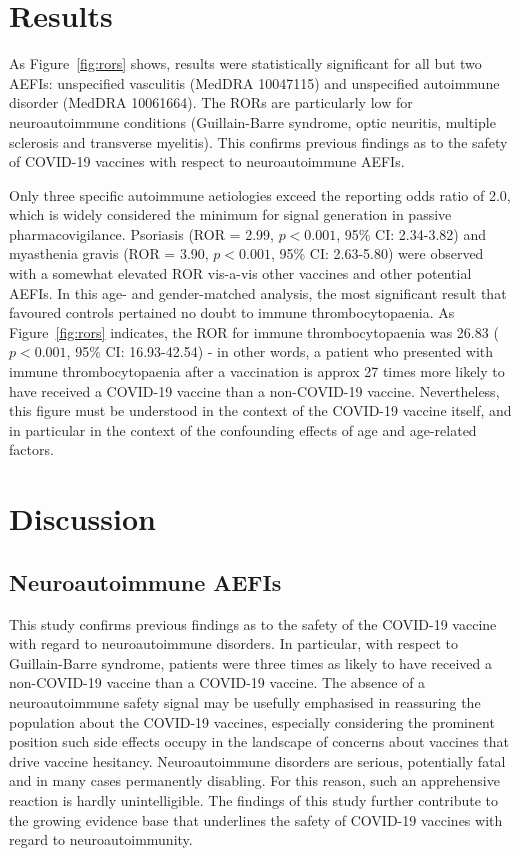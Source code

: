 \documentclass{article}
\begin{document}
\section{Results}

As Figure~\ref{fig:rors} shows, results were statistically significant for all but two AEFIs: unspecified vasculitis (MedDRA 10047115) and unspecified autoimmune disorder (MedDRA 10061664).
The RORs are particularly low for neuroautoimmune conditions (Guillain-Barre syndrome, optic neuritis, multiple sclerosis and transverse myelitis).
This confirms previous findings as to the safety of COVID-19 vaccines with respect to neuroautoimmune AEFIs.\cite{von2021vaers}

Only three specific autoimmune aetiologies exceed the reporting odds ratio of 2.0, which is widely considered the minimum for signal generation in passive pharmacovigilance.
Psoriasis (ROR = 2.99, $p < 0.001$, 95\% CI: 2.34-3.82) and myasthenia gravis (ROR = 3.90, $p < 0.001$, 95\% CI: 2.63-5.80) were observed with a somewhat elevated ROR vis-a-vis other vaccines and other potential AEFIs.
In this age- and gender-matched analysis, the most significant result that favoured controls pertained no doubt to immune thrombocytopaenia.
As Figure~\ref{fig:rors} indicates, the ROR for immune thrombocytopaenia was 26.83 ($p < 0.001$, 95\% CI: 16.93-42.54) - in other words, a patient who presented with immune thrombocytopaenia after a vaccination is approx 27 times more likely to have received a COVID-19 vaccine than a non-COVID-19 vaccine.
Nevertheless, this figure must be understood in the context of the COVID-19 vaccine itself, and in particular in the context of the confounding effects of age and age-related factors.

\section{Discussion}

\subsection{Neuroautoimmune AEFIs}

This study confirms previous findings as to the safety of the COVID-19 vaccine with regard to neuroautoimmune disorders.\cite{von2021vaers}
In particular, with respect to Guillain-Barre syndrome, patients were three times as likely to have received a non-COVID-19 vaccine than a COVID-19 vaccine.
The absence of a neuroautoimmune safety signal may be usefully emphasised in reassuring the population about the COVID-19 vaccines, especially considering the prominent position such side effects occupy in the landscape of concerns about vaccines that drive vaccine hesitancy.\cite{berry2021lessons}
Neuroautoimmune disorders are serious, potentially fatal and in many cases permanently disabling.
For this reason, such an apprehensive reaction is hardly unintelligible.
The findings of this study further contribute to the growing evidence base that underlines the safety of COVID-19 vaccines with regard to neuroautoimmunity.
\end{document}
